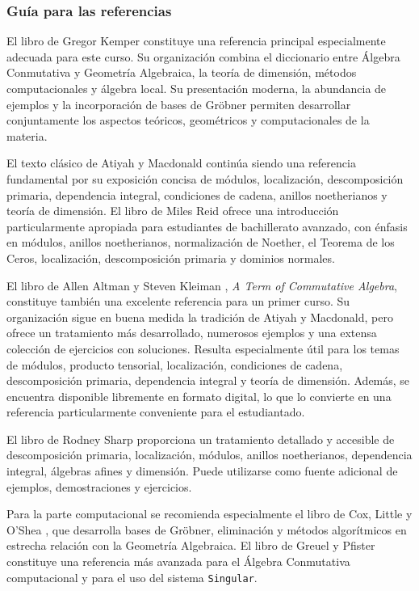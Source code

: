 \begin{refsection}
\subsubsection*{Guía para las referencias}

El libro de Gregor Kemper \cite{Kem11} constituye una referencia principal especialmente adecuada para este curso. Su organización combina el diccionario entre Álgebra Conmutativa y Geometría Algebraica, la teoría de dimensión, métodos computacionales y álgebra local. Su presentación moderna, la abundancia de ejemplos y la incorporación de bases de Gröbner permiten desarrollar conjuntamente los aspectos teóricos, geométricos y computacionales de la materia.

El texto clásico de Atiyah y Macdonald \cite{AM69} continúa siendo una referencia fundamental por su exposición concisa de módulos, localización, descomposición primaria, dependencia integral, condiciones de cadena, anillos noetherianos y teoría de dimensión. El libro de Miles Reid \cite{Rei95} ofrece una introducción particularmente apropiada para estudiantes de bachillerato avanzado, con énfasis en módulos, anillos noetherianos, normalización de Noether, el Teorema de los Ceros, localización, descomposición primaria y dominios normales.

El libro de Allen Altman y Steven Kleiman \cite{AK21}, \emph{A Term of Commutative Algebra}, constituye también una excelente referencia para un primer curso. Su organización sigue en buena medida la tradición de Atiyah y Macdonald, pero ofrece un tratamiento más desarrollado, numerosos ejemplos y una extensa colección de ejercicios con soluciones. Resulta especialmente útil para los temas de módulos, producto tensorial, localización, condiciones de cadena, descomposición primaria, dependencia integral y teoría de dimensión. Además, se encuentra disponible libremente en formato digital, lo que lo convierte en una referencia particularmente conveniente para el estudiantado.

El libro de Rodney Sharp \cite{Sha00} proporciona un tratamiento detallado y accesible de descomposición primaria, localización, módulos, anillos noetherianos, dependencia integral, álgebras afines y dimensión. Puede utilizarse como fuente adicional de ejemplos, demostraciones y ejercicios.

Para la parte computacional se recomienda especialmente el libro de Cox, Little y O'Shea \cite{CLO25}, que desarrolla bases de Gröbner, eliminación y métodos algorítmicos en estrecha relación con la Geometría Algebraica. El libro de Greuel y Pfister \cite{GP08} constituye una referencia más avanzada para el Álgebra Conmutativa computacional y para el uso del sistema \texttt{Singular}.


\end{refsection}
